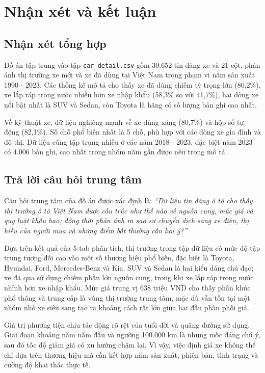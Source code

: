 \section{Nhận xét và kết luận}

\subsection{Nhận xét tổng hợp}

Đồ án tập trung vào tập \texttt{car\_detail.csv} gồm 30.652 tin đăng xe và 21 cột, phản ánh thị trường xe mới và xe đã dùng tại Việt Nam trong phạm vi năm sản xuất 1990 - 2023. Các thống kê mô tả cho thấy xe đã dùng chiếm tỷ trọng lớn (80,2\%), xe lắp ráp trong nước nhiều hơn xe nhập khẩu (58,3\% so với 41,7\%), hai dòng xe nổi bật nhất là SUV và Sedan, còn Toyota là hãng có số lượng bản ghi cao nhất.

Về kỹ thuật xe, dữ liệu nghiêng mạnh về xe dùng xăng (80,7\%) và hộp số tự động (82,1\%). Số chỗ phổ biến nhất là 5 chỗ, phù hợp với các dòng xe gia đình và đô thị. Dữ liệu cũng tập trung nhiều ở các năm 2018 - 2023, đặc biệt năm 2023 có 4.006 bản ghi, cao nhất trong nhóm năm gần được nêu trong mô tả.

\subsection{Trả lời câu hỏi trung tâm}

Câu hỏi trung tâm của đồ án được xác định là: \textit{``Dữ liệu tin đăng ô tô cho thấy thị trường ô tô Việt Nam được cấu trúc như thế nào về nguồn cung, mức giá và quy luật khấu hao; đồng thời phản ánh ra sao sự chuyển dịch sang xe điện, thị hiếu của người mua và những điểm bất thường cần lưu ý?''}

Dựa trên kết quả của 5 tab phân tích, thị trường trong tập dữ liệu có mức độ tập trung tương đối cao vào một số thương hiệu phổ biến, đặc biệt là Toyota, Hyundai, Ford, Mercedes-Benz và Kia. SUV và Sedan là hai kiểu dáng chủ đạo; xe đã qua sử dụng chiếm phần lớn nguồn cung, trong khi xe lắp ráp trong nước nhỉnh hơn xe nhập khẩu. Mức giá trung vị 638 triệu VND cho thấy phân khúc phổ thông và trung cấp là vùng thị trường trung tâm, mặc dù vẫn tồn tại một nhóm nhỏ xe siêu sang tạo ra khoảng cách rất lớn giữa hai đầu phân phối giá.

Giá trị phương tiện chịu tác động rõ rệt của tuổi đời và quãng đường sử dụng. Giai đoạn khoảng năm năm đầu và ngưỡng 100.000 km là những mốc đáng chú ý, sau đó tốc độ giảm giá có xu hướng chậm lại. Vì vậy, việc định giá xe không thể chỉ dựa trên thương hiệu mà cần kết hợp năm sản xuất, phiên bản, tình trạng và cường độ khai thác thực tế.

